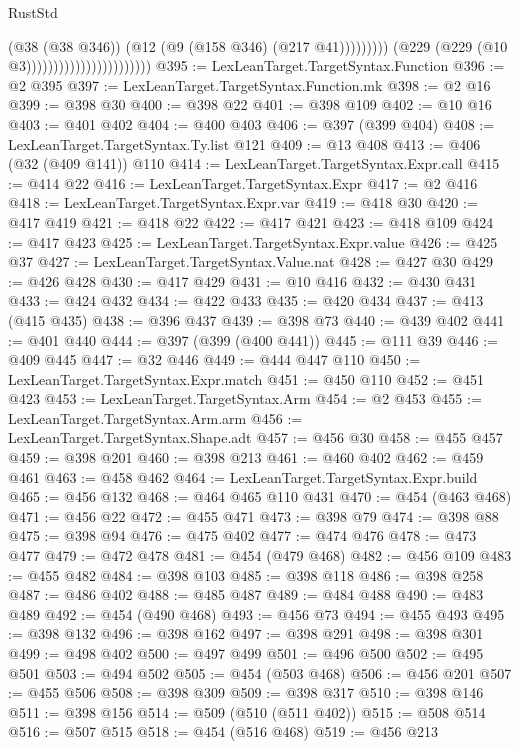 \begin{lexlean}{RustStd}
\begin{coremodule}
{\begin{coremodule}
{{{{{{{{{{{{{{{{{{{{{{{{{{{{{{{{                                                        (@38 (@38 @346))
                                                        (@12 (@9 (@158 @346) (@217 @41)))))))))
                                            (@229 (@229 (@10 @3)))))))))))))))))))))))
@395 := LexLeanTarget.TargetSyntax.Function
@396 := @2 @395
@397 := LexLeanTarget.TargetSyntax.Function.mk
@398 := @2 @16
@399 := @398 @30
@400 := @398 @22
@401 := @398 @109
@402 := @10 @16
@403 := @401 @402
@404 := @400 @403
@406 := @397 (@399 @404)
@408 := LexLeanTarget.TargetSyntax.Ty.list @121
@409 := @13 @408
@413 := @406 (@32 (@409 @141)) @110
@414 := LexLeanTarget.TargetSyntax.Expr.call
@415 := @414 @22
@416 := LexLeanTarget.TargetSyntax.Expr
@417 := @2 @416
@418 := LexLeanTarget.TargetSyntax.Expr.var
@419 := @418 @30
@420 := @417 @419
@421 := @418 @22
@422 := @417 @421
@423 := @418 @109
@424 := @417 @423
@425 := LexLeanTarget.TargetSyntax.Expr.value
@426 := @425 @37
@427 := LexLeanTarget.TargetSyntax.Value.nat
@428 := @427 @30
@429 := @426 @428
@430 := @417 @429
@431 := @10 @416
@432 := @430 @431
@433 := @424 @432
@434 := @422 @433
@435 := @420 @434
@437 := @413 (@415 @435)
@438 := @396 @437
@439 := @398 @73
@440 := @439 @402
@441 := @401 @440
@444 := @397 (@399 (@400 @441))
@445 := @111 @39
@446 := @409 @445
@447 := @32 @446
@449 := @444 @447 @110
@450 := LexLeanTarget.TargetSyntax.Expr.match
@451 := @450 @110
@452 := @451 @423
@453 := LexLeanTarget.TargetSyntax.Arm
@454 := @2 @453
@455 := LexLeanTarget.TargetSyntax.Arm.arm
@456 := LexLeanTarget.TargetSyntax.Shape.adt
@457 := @456 @30
@458 := @455 @457
@459 := @398 @201
@460 := @398 @213
@461 := @460 @402
@462 := @459 @461
@463 := @458 @462
@464 := LexLeanTarget.TargetSyntax.Expr.build
@465 := @456 @132
@468 := @464 @465 @110 @431
@470 := @454 (@463 @468)
@471 := @456 @22
@472 := @455 @471
@473 := @398 @79
@474 := @398 @88
@475 := @398 @94
@476 := @475 @402
@477 := @474 @476
@478 := @473 @477
@479 := @472 @478
@481 := @454 (@479 @468)
@482 := @456 @109
@483 := @455 @482
@484 := @398 @103
@485 := @398 @118
@486 := @398 @258
@487 := @486 @402
@488 := @485 @487
@489 := @484 @488
@490 := @483 @489
@492 := @454 (@490 @468)
@493 := @456 @73
@494 := @455 @493
@495 := @398 @132
@496 := @398 @162
@497 := @398 @291
@498 := @398 @301
@499 := @498 @402
@500 := @497 @499
@501 := @496 @500
@502 := @495 @501
@503 := @494 @502
@505 := @454 (@503 @468)
@506 := @456 @201
@507 := @455 @506
@508 := @398 @309
@509 := @398 @317
@510 := @398 @146
@511 := @398 @156
@514 := @509 (@510 (@511 @402))
@515 := @508 @514
@516 := @507 @515
@518 := @454 (@516 @468)
@519 := @456 @213
}}}}}}}}}}}}}}}}}}}}}}}}}}}}}}}}
\end{coremodule}}
\end{coremodule}
\end{lexlean}

